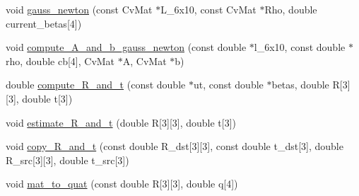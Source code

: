 \begin{DoxyCompactItemize}
\item 
void \mbox{\hyperlink{class_o_r_b___s_l_a_m2_1_1_pn_psolver_a4b2b11d8afbf638d8cd48d739b071073}{gauss\+\_\+newton}} (const Cv\+Mat $\ast$L\+\_\+6x10, const Cv\+Mat $\ast$Rho, double current\+\_\+betas\mbox{[}4\mbox{]})
\item 
void \mbox{\hyperlink{class_o_r_b___s_l_a_m2_1_1_pn_psolver_aae07f773bf3dc205377bd31afa24702a}{compute\+\_\+\+A\+\_\+and\+\_\+b\+\_\+gauss\+\_\+newton}} (const double $\ast$l\+\_\+6x10, const double $\ast$rho, double cb\mbox{[}4\mbox{]}, Cv\+Mat $\ast$A, Cv\+Mat $\ast$b)
\item 
double \mbox{\hyperlink{class_o_r_b___s_l_a_m2_1_1_pn_psolver_ab893a05c84790a0344d20df7eab604e0}{compute\+\_\+\+R\+\_\+and\+\_\+t}} (const double $\ast$ut, const double $\ast$betas, double R\mbox{[}3\mbox{]}\mbox{[}3\mbox{]}, double t\mbox{[}3\mbox{]})
\item 
void \mbox{\hyperlink{class_o_r_b___s_l_a_m2_1_1_pn_psolver_abf90f06f1d7218d8200b2682817ed08a}{estimate\+\_\+\+R\+\_\+and\+\_\+t}} (double R\mbox{[}3\mbox{]}\mbox{[}3\mbox{]}, double t\mbox{[}3\mbox{]})
\item 
void \mbox{\hyperlink{class_o_r_b___s_l_a_m2_1_1_pn_psolver_aa71c8d15e2c605918bae4bc53dc99904}{copy\+\_\+\+R\+\_\+and\+\_\+t}} (const double R\+\_\+dst\mbox{[}3\mbox{]}\mbox{[}3\mbox{]}, const double t\+\_\+dst\mbox{[}3\mbox{]}, double R\+\_\+src\mbox{[}3\mbox{]}\mbox{[}3\mbox{]}, double t\+\_\+src\mbox{[}3\mbox{]})
\item 
void \mbox{\hyperlink{class_o_r_b___s_l_a_m2_1_1_pn_psolver_a54b16a3fb045afe5425c004ec7b5fa21}{mat\+\_\+to\+\_\+quat}} (const double R\mbox{[}3\mbox{]}\mbox{[}3\mbox{]}, double q\mbox{[}4\mbox{]})
\end{DoxyCompactItemize}
